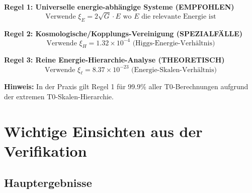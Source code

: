 \documentclass[12pt,a4paper]{article}
\begin{document}
	\begin{tcolorbox}[colback=blue!5!white,colframe=blue!75!black,title=Anwendungsregeln für $\xi$-Parameter (Reine Energie)]
		\textbf{Regel 1: Universelle energie-abhängige Systeme (EMPFOHLEN)}
		\begin{equation}
			\text{Verwende } \xi_E = 2\sqrt{G} \cdot E \text{ wo } E \text{ die relevante Energie ist}
		\end{equation}
		
		\textbf{Regel 2: Kosmologische/Kopplungs-Vereinigung (SPEZIALFÄLLE)}
		\begin{equation}
			\text{Verwende } \xi_H = 1.32 \times 10^{-4} \text{ (Higgs-Energie-Verhältnis)}
		\end{equation}
		
		\textbf{Regel 3: Reine Energie-Hierarchie-Analyse (THEORETISCH)}
		\begin{equation}
			\text{Verwende } \xi_\ell = 8.37 \times 10^{-23} \text{ (Energie-Skalen-Verhältnis)}
		\end{equation}
		
		\textbf{Hinweis:} In der Praxis gilt Regel 1 für 99.9\% aller T0-Berechnungen aufgrund der extremen T0-Skalen-Hierarchie.
	\end{tcolorbox}
	
	\section{Wichtige Einsichten aus der Verifikation}
	
	\subsection{Hauptergebnisse}
	
\end{document}
